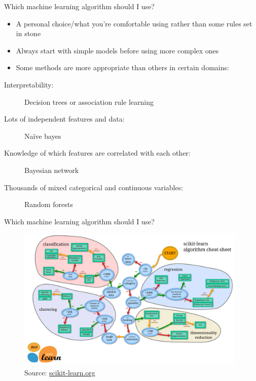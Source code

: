\documentclass[pdf]{beamer}
\begin{document}
\begin{frame}{Which machine learning algorithm should I use?}
 \begin{itemize}\addtolength{\itemsep}{0.8\baselineskip}
	\item A personal choice/what you're comfortable using rather than some rules set in stone
	\item Always start with simple models before using more complex ones
	\item Some methods are more appropriate than others in certain domains:
\end{itemize}
\vfill
\small
\begin{description}
		\item [Interpretability:] Decision trees or association rule learning
		\item [Lots of independent features and data:] Na\"{i}ve bayes
		\item [Knowledge of which features are correlated with each other:] Bayesian network
		\item [Thousands of mixed categorical and continuous variables:] Random forests
\end{description}
\normalsize
\end{frame}
\begin{frame}{Which machine learning algorithm should I use?}
\begin{figure}	
	\begin{center}
		\includegraphics[width=0.98\textwidth]{scikitFlowChart.png}
		\caption{Source: \href{http://scikit-learn.org/stable/tutorial/machine_learning_map/index.html}{scikit-learn.org}}
	\end{center}
\end{figure}
\end{frame}
\end{document}

